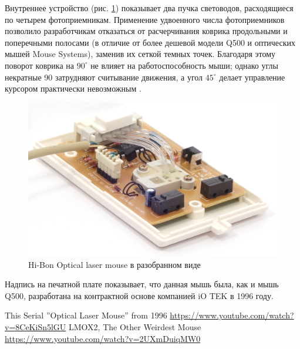 \documentclass[11pt, a4paper]{article}
\begin{document}
Внутреннее устройство (рис. \ref{fig:OpticalLaserMouseInside}) показывает два пучка световодов, расходящиеся по четырем фотоприемникам. Применение удвоенного числа фотоприемников позволило разработчикам отказаться от расчерчивания коврика продольными и поперечными полосами (в отличие от более дешевой модели Q500 и оптических мышей Mouse Systems), заменив их сеткой темных точек. Благодаря этому поворот коврика на $90^\circ$ не влияет на работоспособность мыши; однако углы некратные 90 затрудняют считывание движения, а угол $45^\circ$ делает управление курсором практически невозможным \cite{comparison}.

\begin{figure}[h]
    \centering
    \includegraphics[scale=0.8]{1996_hi-bon_laser_mouse/inside_60.jpg}
    \caption{Hi-Bon Optical laser mouse в разобранном виде}
    \label{fig:OpticalLaserMouseInside}
\end{figure}

Надпись на печатной плате показывает, что данная мышь была, как и мышь Q500, разработана на контрактной основе компанией iO TEK в 1996 году.

\begin{thebibliography}{9}
 This Serial ''Optical Laser Mouse'' from 1996 \url{https://www.youtube.com/watch?v=8CeKiSn5lGU}
 LMOX2, The Other Weirdest Mouse \url{https://www.youtube.com/watch?v=2UXmDuiqMW0}

\end{thebibliography}
\end{document}
